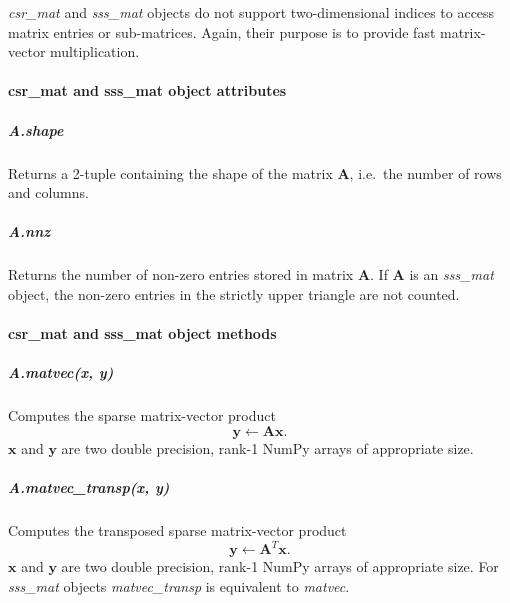 \documentclass[a4paper]{article}
\newcommand{\mat}[1]{\ensuremath{\boldsymbol{#1}}}
\newcommand{\vect}[1]{\ensuremath{\mathbf{#1}}}
\begin{document}
\textit{csr\_mat} and \textit{sss\_mat} objects do not support
two-dimensional indices to access matrix entries or sub-matrices.
Again, their purpose is to provide fast matrix-vector multiplication.

\paragraph{csr\_mat and sss\_mat object attributes}

\subparagraph{A.shape}
%
Returns a 2-tuple containing the shape of the matrix $\mat{A}$, i.e.\ 
the number of rows and columns.

\subparagraph{A.nnz}
%
Returns the number of non-zero entries stored in matrix $\mat{A}$. If
$\mat{A}$ is an \textit{sss\_mat} object, the non-zero entries in the
strictly upper triangle are not counted.

\paragraph{csr\_mat and sss\_mat object methods}

\subparagraph{A.matvec(x, y)}
%
Computes the sparse matrix-vector product 
\begin{equation*}
  \vect{y} \leftarrow \mat{A} \vect{x}.
\end{equation*}
$\vect{x}$ and $\vect{y}$ are two double precision, rank-1 NumPy arrays
of appropriate size.

\subparagraph{A.matvec\_transp(x, y)} 
%
Computes the transposed sparse matrix-vector product
\begin{equation*}
  \vect{y} \leftarrow \mat{A}^T \vect{x}.
\end{equation*}
$\vect{x}$ and $\vect{y}$ are two double precision, rank-1 NumPy arrays
of appropriate size. For \textit{sss\_mat} objects
\textit{matvec\_transp} is equivalent to \textit{matvec}.

\end{document}
